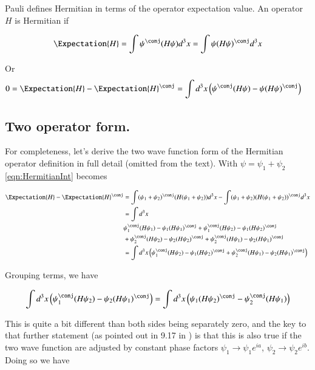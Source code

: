 Pauli defines Hermitian in terms of the operator expectation value.  An operator $H$ is Hermitian if

\begin{align}\label{eqn:Hermitian}
\Expectation{H} = \int \psi^\conj (H \psi) d^3 x = \int \psi (H \psi)^\conj d^3 x
\end{align}

Or
\begin{align}\label{eqn:HermitianInt}
0 &= \Expectation{H} - \Expectation{H}^\conj = \int d^3 x \left( \psi^\conj (H \psi) - \psi (H \psi)^\conj \right)
\end{align}

\subsection{Two operator form. }

For completeness, let's derive the two wave function form of the Hermitian operator definition in full detail (omitted from the text).  With $\psi = \psi_1 + \psi_2$
\ref{eqn:HermitianInt} becomes

\begin{align*}
\Expectation{H} - \Expectation{H}^\conj
&= \int (\psi_1 + \psi_2)^\conj (H (\psi_1 + \psi_2)) d^3 x - \int (\psi_1 + \psi_2) (H (\psi_1 + \psi_2))^\conj d^3 x \\
&= \int d^3 x \\
&\psi_1^\conj (H \psi_1) - \psi_1 (H \psi_1)^\conj 
+\psi_1^\conj (H \psi_2) - \psi_1 (H \psi_2)^\conj \\
&+\psi_2^\conj (H \psi_2) - \psi_2 (H \psi_2)^\conj 
+\psi_2^\conj (H \psi_1) - \psi_2 (H \psi_1)^\conj \\
&= \int d^3 x
\left( \psi_1^\conj (H \psi_2) - \psi_1 (H \psi_2)^\conj 
+\psi_2^\conj (H \psi_1) - \psi_2 (H \psi_1)^\conj \right) \\
\end{align*}

Grouping terms, we have 

\begin{align*}
\int d^3 x \left( \psi_1^\conj (H \psi_2) - \psi_2 (H \psi_1)^\conj \right) = \int d^3 x \left( \psi_1 (H \psi_2)^\conj - \psi_2^\conj (H \psi_1) \right)
\end{align*}

This is quite a bit different than both sides being separately zero, and the key to that further statement (as pointed out in 9.17 in \cite{bohm1989qt}) 
is that this is also true if the two wave function are adjusted by constant phase factors
$\psi_1 \rightarrow \psi_1 e^{ia}$, 
$\psi_2 \rightarrow \psi_2 e^{ib}$.  Doing so we have

